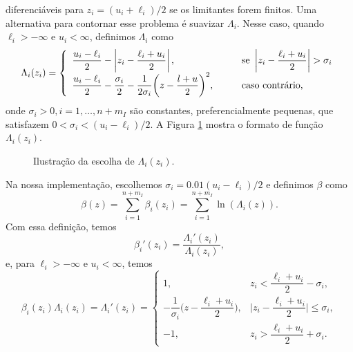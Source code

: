 diferenciáveis para $z_i = (u_i + \ell_i)/2$ se os limitantes forem finitos. 
Uma alternativa para contornar esse problema é suavizar $\Lambda_i$.
Nesse caso, quando $\ell_i > -\infty$ e $u_i < \infty$, definimos $\Lambda_i$
como
\begin{equation*}
  \Lambda_i(z_i) = \left\{
  \begin{array}{ll}
    \dfrac{u_i-\ell_i}{2} -\left|  z_i - \dfrac{\ell_i+u_i}{2} \right|, &
      \qquad \mbox{se } \left| z_i-\dfrac{\ell_i+u_i}{2}\right| > \sigma_i \\
    \dfrac{u_i-\ell_i}{2}-\dfrac{\sigma_i}{2} -
    \dfrac{1}{2\sigma_i}\bigg(z - \dfrac{l+u}{2}\bigg)^2, &
      \qquad \mbox{caso contrário},
  \end{array}
  \right.
\end{equation*}
onde $\sigma_i > 0, i = 1,\dots,n+m_I$ são constantes, preferencialmente 
pequenas, que satisfazem $0 < \sigma_i < (u_i-\ell_i)/2$. A Figura \ref{fig:lambda}
mostra o formato de função $\Lambda_i(z_i)$.
\begin{figure}[H]
\centering
{}
\caption{Ilustração da escolha de $\Lambda_i(z_i)$.}
\label{fig:lambda}
\end{figure}
Na nossa implementação, escolhemos $\sigma_i = 0.01(u_i-\ell_i)/2$ e definimos
$\beta$ como
$$ \beta(z) = \sum_{i=1}^{n+m_I}\beta_i(z_i) = \sum_{i=1}^{n+m_I}\ln(\Lambda_i(z)). $$
Com essa definição, temos
$$ \beta_i'(z_i) = \frac{\Lambda_i'(z_i)}{\Lambda_i(z_i)}, $$
e, para $\ell_i > -\infty$ e $u_i < \infty$, temos
\begin{equation*}
  \beta_i(z_i)\Lambda_i(z_i) = \Lambda_i'(z_i) = \left\{
  \begin{array}{ll}
    1, & z_i < \dfrac{\ell_i+u_i}{2} - \sigma_i, \\
    -\dfrac{1}{\sigma_i}\bigg(z - \dfrac{\ell_i+u_i}{2}\bigg), &
      \bigg|z_i-\dfrac{\ell_i+u_i}{2}\bigg| \leq \sigma_i, \\
    -1, & z_i > \dfrac{\ell_i+u_i}{2} + \sigma_i.
  \end{array}\right.
\end{equation*}

